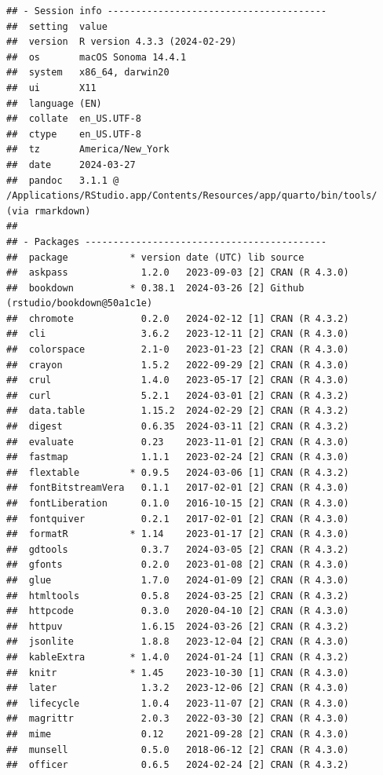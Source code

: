 \documentclass[
]{book}
\begin{document}
\begin{lstlisting}
## - Session info ---------------------------------------
##  setting  value
##  version  R version 4.3.3 (2024-02-29)
##  os       macOS Sonoma 14.4.1
##  system   x86_64, darwin20
##  ui       X11
##  language (EN)
##  collate  en_US.UTF-8
##  ctype    en_US.UTF-8
##  tz       America/New_York
##  date     2024-03-27
##  pandoc   3.1.1 @ /Applications/RStudio.app/Contents/Resources/app/quarto/bin/tools/ (via rmarkdown)
## 
## - Packages -------------------------------------------
##  package           * version date (UTC) lib source
##  askpass             1.2.0   2023-09-03 [2] CRAN (R 4.3.0)
##  bookdown          * 0.38.1  2024-03-26 [2] Github (rstudio/bookdown@50a1c1e)
##  chromote            0.2.0   2024-02-12 [1] CRAN (R 4.3.2)
##  cli                 3.6.2   2023-12-11 [2] CRAN (R 4.3.0)
##  colorspace          2.1-0   2023-01-23 [2] CRAN (R 4.3.0)
##  crayon              1.5.2   2022-09-29 [2] CRAN (R 4.3.0)
##  crul                1.4.0   2023-05-17 [2] CRAN (R 4.3.0)
##  curl                5.2.1   2024-03-01 [2] CRAN (R 4.3.2)
##  data.table          1.15.2  2024-02-29 [2] CRAN (R 4.3.2)
##  digest              0.6.35  2024-03-11 [2] CRAN (R 4.3.2)
##  evaluate            0.23    2023-11-01 [2] CRAN (R 4.3.0)
##  fastmap             1.1.1   2023-02-24 [2] CRAN (R 4.3.0)
##  flextable         * 0.9.5   2024-03-06 [1] CRAN (R 4.3.2)
##  fontBitstreamVera   0.1.1   2017-02-01 [2] CRAN (R 4.3.0)
##  fontLiberation      0.1.0   2016-10-15 [2] CRAN (R 4.3.0)
##  fontquiver          0.2.1   2017-02-01 [2] CRAN (R 4.3.0)
##  formatR           * 1.14    2023-01-17 [2] CRAN (R 4.3.0)
##  gdtools             0.3.7   2024-03-05 [2] CRAN (R 4.3.2)
##  gfonts              0.2.0   2023-01-08 [2] CRAN (R 4.3.0)
##  glue                1.7.0   2024-01-09 [2] CRAN (R 4.3.0)
##  htmltools           0.5.8   2024-03-25 [2] CRAN (R 4.3.2)
##  httpcode            0.3.0   2020-04-10 [2] CRAN (R 4.3.0)
##  httpuv              1.6.15  2024-03-26 [2] CRAN (R 4.3.2)
##  jsonlite            1.8.8   2023-12-04 [2] CRAN (R 4.3.0)
##  kableExtra        * 1.4.0   2024-01-24 [1] CRAN (R 4.3.2)
##  knitr             * 1.45    2023-10-30 [1] CRAN (R 4.3.0)
##  later               1.3.2   2023-12-06 [2] CRAN (R 4.3.0)
##  lifecycle           1.0.4   2023-11-07 [2] CRAN (R 4.3.0)
##  magrittr            2.0.3   2022-03-30 [2] CRAN (R 4.3.0)
##  mime                0.12    2021-09-28 [2] CRAN (R 4.3.0)
##  munsell             0.5.0   2018-06-12 [2] CRAN (R 4.3.0)
##  officer             0.6.5   2024-02-24 [2] CRAN (R 4.3.2)

\end{lstlisting}
\end{document}
